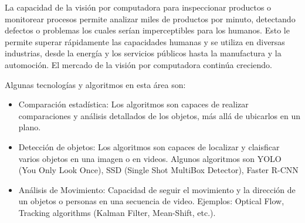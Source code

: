 La capacidad de la visión por computadora para inspeccionar productos o monitorear procesos permite analizar miles de productos por minuto, detectando defectos o problemas los cuales serían imperceptibles para los humanos. Esto le permite superar rápidamente las capacidades humanas y se utiliza en diversas industrias, desde la energía y los servicios públicos hasta la manufactura y la automoción. El mercado de la visión por computadora continúa creciendo.


Algunas tecnologías y algoritmos en esta área son:


\newcommand{\CVone}{ Comparación estadística: Los algoritmos son capaces de  realizar comparaciones y análisis detallados de los objetos, más allá de ubicarlos en un plano.}
\newcommand{\CVtwo}{Detección de objetos: Los algoritmos son capaces de localizar y claisficar varios objetos en una imagen o en videos. Algunos algoritmos son YOLO (You Only Look Once), SSD (Single Shot MultiBox Detector), Faster R-CNN }
\newcommand{\CVthree}{ Análisis de Movimiento: Capacidad de seguir el movimiento y la dirección de un objetos o personas en una secuencia de video. Ejemplos: Optical Flow, Tracking algorithms (Kalman Filter, Mean-Shift, etc.). }

\begin{itemize}
	\item \CVone
	\item \CVtwo
	\item \CVthree
\end{itemize}
